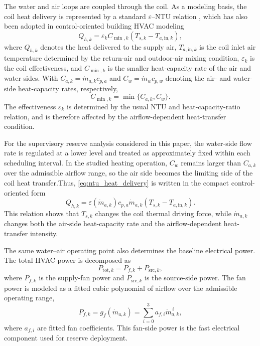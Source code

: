\documentclass[journal]{IEEEtran}
\theoremstyle{remark}
\begin{document}
The water and air loops are coupled through the coil. As a modeling basis, the coil heat delivery is represented by a standard $\varepsilon$--NTU relation \cite{sekulic2023fundamentals}, which has also been adopted in control-oriented building HVAC modeling \cite{mantovani2014temperature}
\begin{equation}
	Q_{h,k}
	=
	\varepsilon_k C_{\min,k}
	\left(T_{s,k}-T_{a,\mathrm{in},k}\right),
	\label{eq:ntu_heat_delivery}
\end{equation}
where \(Q_{h,k}\) denotes the heat delivered to the supply air, \(T_{a,\mathrm{in},k}\) is the coil inlet air temperature determined by the return-air and outdoor-air mixing condition, \(\varepsilon_k\) is the coil effectiveness, and \(C_{\min,k}\) is the smaller heat-capacity rate of the air and water sides. With \(C_{a,k}=\dot m_{a,k}c_{p,a}\) and \(C_w=\dot m_w c_{p,w}\) denoting the air- and water-side heat-capacity rates, respectively,
\begin{equation}
	C_{\min,k}=\min\{C_{a,k},C_w\}.
	\label{eq:capacity_rates}
\end{equation}
The effectiveness \(\varepsilon_k\) is determined by the usual NTU and heat-capacity-ratio relation, and is therefore affected by the airflow-dependent heat-transfer condition.

For the supervisory reserve analysis considered in this paper, the water-side flow rate is regulated at a lower level and treated as approximately fixed within each scheduling interval. In the studied heating operation, \(C_w\) remains larger than \(C_{a,k}\) over the admissible airflow range, so the air side becomes the limiting side of the coil heat transfer.Thus, \eqref{eq:ntu_heat_delivery} is written in the compact
control-oriented form
\begin{equation}
	Q_{h,k}
	=
	\varepsilon(\dot m_{a,k})
	c_{p,a}\dot m_{a,k}
	\left(T_{s,k}-T_{a,\mathrm{in},k}\right).
	\label{eq:control_heat_delivery}
\end{equation}
This relation shows that \(T_{s,k}\) changes the coil thermal driving force, while \(\dot m_{a,k}\) changes both the air-side heat-capacity rate and the airflow-dependent heat-transfer intensity.

The same water--air operating point also determines the baseline electrical power. The total HVAC power is decomposed as
\begin{equation}
	P_{\mathrm{tot},k}
	=
	P_{f,k}+P_{\mathrm{src},k},
	\label{eq:total_power}
\end{equation}
where \(P_{f,k}\) is the supply-fan power and \(P_{\mathrm{src},k}\) is the source-side power. The fan power is modeled as a fitted cubic polynomial of airflow over
the admissible operating range,
\begin{equation}
	P_{f,k}=g_f(\dot m_{a,k})
	=
	\sum_{i=0}^{3} a_{f,i}\dot m_{a,k}^{\,i},
	\label{eq:fan_power}
\end{equation}
where \(a_{f,i}\) are fitted fan coefficients. This fan-side power is the fast electrical component used for reserve deployment.
\end{document}
